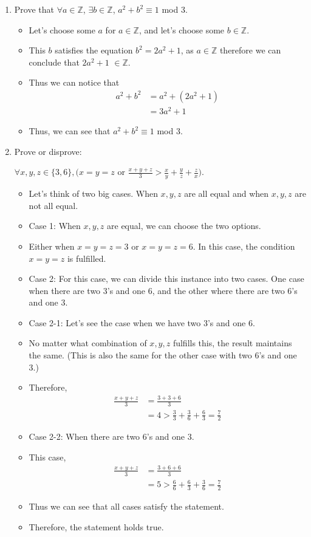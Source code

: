 \documentclass[letterpaper,12pt]{article}
\begin{document}
\begin{enumerate}
\item Prove that $\forall a \in \mathbb{Z}$, $\exists b \in \mathbb{Z}$, $a^2+b^2 \equiv 1 $ mod 3.
\begin{itemize}
	\item Let's choose some $a $ for $a \in \mathbb{Z}$, and let's choose some $b\in \mathbb{Z}$.
	\item This $b$ satisfies the equation $b^2 = 2a^2+1$, as $a\in \mathbb{Z}$ therefore we can conclude that $2a^2+1$ $\in \mathbb{Z}$.
	\item Thus we can notice that
	\begin{align}
		a^2+b^2 &= a^2 + (2a^2+1) \\&=3a^2+1
	\end{align}
	\item Thus, we can see that $a^2+b^2 \equiv 1 $ mod 3.
\end{itemize}
\item Prove or disprove:
\begin{center}
$\forall x,y,z \in \{3,6\}, \biggl(x=y=z $ or $\frac{x+y+z}{3} >\frac{x}{y}+\frac{y}{z} + \frac{z}{x} \biggr).$	
\end{center}
\begin{itemize}
	\item Let's think of two big cases. When $x,y,z$ are all equal and when $x,y,z$ are not all equal.
	\item Case 1: When $x,y,z$ are equal, we can choose the two options.
	\item Either when $x=y=z=3$ or $x=y=z=6$. In this case, the condition $x=y=z$ is fulfilled.
	\item Case 2: For this case, we can divide this instance  into two cases. One case when there are two 3's and one 6, and the other where there are two 6's and one 3.
	\item Case 2-1: Let's see the case when we have two 3's and one 6.
	\item No matter what combination of $x,y,z$ fulfills this, the result maintains the same. (This is also the same for the other case with two 6's and one 3.)
	\item Therefore, 
	\begin{align}
		\frac{x+y+z}{3} &= \frac{3+3+6}{3} \\&= 4 > \frac{3}{3}+\frac{3}{6}+\frac{6}{3} = \frac{7}{2}
	\end{align}
	\item Case 2-2: When there are two 6's and one 3.
	\item This case,
	\begin{align}
		\frac{x+y+z}{3} &= \frac{3+6+6}{3} \\ &= 5 > \frac{6}{6} + \frac{6}{3} + \frac{3}{6} = \frac{7}{2}
	\end{align}
	\item Thus we can see that all cases satisfy the statement.
	\item Therefore, the statement holds true.
\end{itemize}


\end{enumerate}
\end{document}
